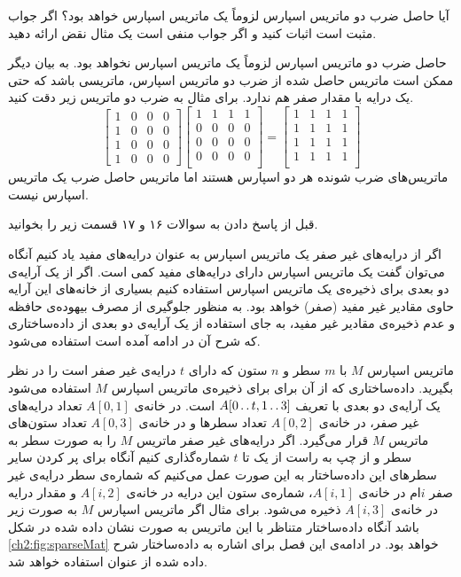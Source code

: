 
 آیا حاصل ضرب دو ماتریس اسپارس لزوماً یک ماتریس اسپارس خواهد بود؟ اگر جواب مثبت است اثبات کنید و اگر جواب منفی است یک مثال نقض ارائه دهید.


حاصل ضرب دو ماتریس اسپارس لزوماً یک ماتریس اسپارس نخواهد بود. به بیان دیگر ممکن است ماتریس حاصل شده از ضرب دو ماتریس اسپارس، ماتریسی باشد که حتی یک درایه با مقدار صفر هم ندارد. برای مثال به ضرب دو ماتریس زیر دقت کنید.
$$
\begin{bmatrix}
1 & 0 & 0 & 0\\
1 & 0 & 0 & 0\\
1 & 0 & 0 & 0\\
1 & 0 & 0 & 0
\end{bmatrix}
\begin{bmatrix}
1 & 1 & 1 & 1\\
0 & 0 & 0 & 0\\
0 & 0 & 0 & 0\\
0 & 0 & 0 & 0\\
\end{bmatrix}
=
\begin{bmatrix}
1 & 1 & 1 & 1\\
1 & 1 & 1 & 1\\
1 & 1 & 1 & 1\\
1 & 1 & 1 & 1\\
\end{bmatrix}
$$
ماتریس‌های ضرب شونده هر دو اسپارس هستند اما ماتریس حاصل ضرب یک ماتریس اسپارس نیست.

قبل از پاسخ دادن به سوالات ۱۶ و ۱۷ قسمت زیر را بخوانید.

اگر از درایه‌های غیر صفر یک ماتریس اسپارس به عنوان درایه‌های مفید یاد کنیم آنگاه می‌توان گفت یک ماتریس اسپارس دارای درایه‌های مفید کمی است. اگر از یک آرایه‌ی دو بعدی برای ذخیره‌ی یک ماتریس اسپارس استفاده کنیم بسیاری از خانه‌های این آرایه حاوی مقادیر غیر مفید (صفر) خواهد بود. به منظور جلوگیری از مصرف بیهوده‌ی حافظه و عدم ذخیره‌ی مقادیر غیر مفید، به جای استفاده از یک آرایه‌ی دو بعدی از داده‌ساختاری که شرح آن در ادامه آمده است استفاده می‌شود.

ماتریس اسپارس {$M$} با {$m$} سطر و {$n$} ستون که دارای {$t$} درایه‌ی غیر صفر است را در نظر بگیرید. داده‌ساختاری که از آن برای برای ذخیره‌ی ماتریس اسپارس {$M$} استفاده می‌شود یک آرایه‌ی دو بعدی با تعریف {$A[0\mathinner{\ldotp\ldotp} t,1\mathinner{\ldotp\ldotp} 3]$} است. در خانه‌ی {$A[0,1]$} تعداد درایه‌های غیر صفر، در خانه‌ی {$A[0,2]$} تعداد سطرها و در خانه‌ی {$A[0,3]$} تعداد ستون‌های ماتریس {$M$} قرار می‌گیرد. اگر درایه‌های غیر صفر ماتریس {$M$} را به صورت سطر به سطر و از چپ به راست از یک تا {$t$} شماره‌گذاری کنیم آنگاه برای پر کردن سایر سطرهای این داده‌ساختار به این صورت عمل می‌کنیم که شماره‌ی سطر درایه‌ی غیر صفر {$i$}ام در خانه‌ی {$A[i,1]$}، شماره‌ی ستون این درایه در خانه‌ی {$A[i,2]$} و مقدار درایه در خانه‌ی {$A[i,3]$} ذخیره می‌شود. برای مثال اگر ماتریس اسپارس {$M$} به صورت زیر باشد آنگاه داده‌ساختار متناظر با این ماتریس به صورت نشان داده شده در شکل {\eqref{ch2:fig:sparseMat}} خواهد بود. در ادامه‌ی این فصل برای اشاره به داده‌ساختار شرح داده شده از عنوان {} استفاده خواهد شد.

